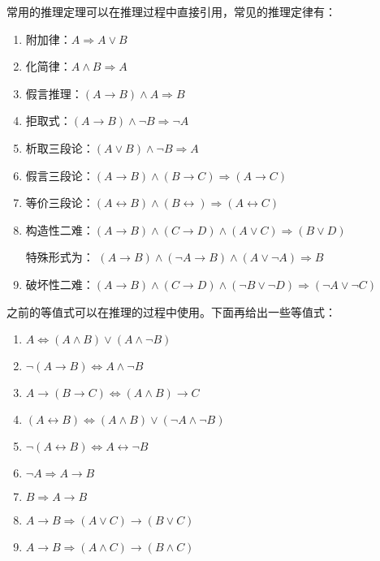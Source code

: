 \documentclass[a4paper,11pt]{article}%
\theoremstyle{remark}
\theoremstyle{remark}
\theoremstyle{definition}
\theoremstyle{definition}
\theoremstyle{plain}
\begin{document}
常用的推理定理可以在推理过程中直接引用，常见的推理定律有：
\begin{enumerate}
    \item 附加律：$A\Rightarrow A\lor B$
    \item 化简律：$A\land B\Rightarrow A$
    \item 假言推理：$(A\rightarrow B)\land A\Rightarrow B$
    \item 拒取式：$(A\rightarrow B)\land \lnot B\Rightarrow\lnot A$
    \item 析取三段论：$(A\lor B)\land\lnot B\Rightarrow A$
    \item 假言三段论：$(A\rightarrow B)\land(B\rightarrow C)\Rightarrow(A\rightarrow C)$
    \item 等价三段论：$(A\leftrightarrow B)\land(B\leftrightarrow)\Rightarrow(A\leftrightarrow C)$
    \item  构造性二难：$(A\rightarrow B)\land(C\rightarrow D)\land (A\lor C)\Rightarrow(B\lor D)$
    
    特殊形式为： $(A\rightarrow B)\land(\lnot A\rightarrow B)\land(A\lor\lnot A)\Rightarrow B$
    \item 破坏性二难：$(A\rightarrow B)\land(C\rightarrow D)\land(\lnot B\lor\lnot D)\Rightarrow(\lnot A\lor\lnot C)$
\end{enumerate}
之前的等值式可以在推理的过程中使用。下面再给出一些等值式：
\begin{enumerate}
    \item $A\Leftrightarrow(A\land B)\lor(A\land\lnot B)$
    \item $\lnot(A\rightarrow B)\Leftrightarrow A\land\lnot B$
    \item $A\rightarrow(B\rightarrow C)\Leftrightarrow(A\land B)\rightarrow C$
    \item $(A\leftrightarrow B)\Leftrightarrow(A\land B)\lor(\lnot A\land\lnot B)$
    \item $\lnot(A\leftrightarrow B)\Leftrightarrow A\leftrightarrow \lnot B$
    \item $\lnot A\Rightarrow A\rightarrow B$
    \item $B\Rightarrow A\rightarrow B$
    \item $A\rightarrow B\Rightarrow(A\lor C)\rightarrow(B\lor C)$
    \item $A\rightarrow B\Rightarrow(A\land C)\rightarrow(B\land C)$
\end{enumerate}
\end{document}
